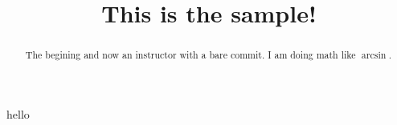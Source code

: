 \documentclass{ximera}
\title{This is the sample!}
\begin{document}
\begin{abstract}
  The begining and now an instructor with a bare commit.  I am doing math like $\arcsin$.
\end{abstract}

\maketitle

\mypreamble



hello

      




\end{document}
